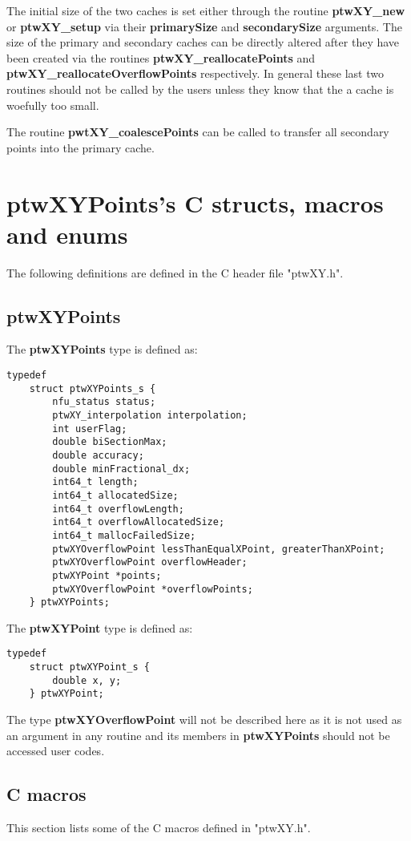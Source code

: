 \documentclass[11pt]{article}
\newcommand{\highlight}[1]{{\bf #1}}
\begin{document}
The initial size of the two caches is set either through the routine \highlight{ptwXY\_new} or \highlight{ptwXY\_\-setup} via their
\highlight{primarySize} and \highlight{secondarySize} arguments. The size of the primary and secondary caches can be directly altered after
they have been created via the
routines \highlight{ptwXY\_reallo\-cate\-Points} and \highlight{ptwXY\_\-reallo\-cate\-Overflow\-Points} respectively. 
In general these last two routines should
not be called by the users unless they know that the a cache is woefully too small.

The routine \highlight{pwtXY\_coalescePoints} can be called to transfer all secondary points into the primary cache.

\section{ptwXYPoints's C structs, macros and enums}
The following definitions are defined in the C header file "ptwXY.h".

\subsection{ptwXYPoints}
The \highlight{ptwXYPoints} type is defined as:
\begin{verbatim}
typedef
    struct ptwXYPoints_s {
        nfu_status status;
        ptwXY_interpolation interpolation;
        int userFlag;
        double biSectionMax;
        double accuracy;
        double minFractional_dx;
        int64_t length;
        int64_t allocatedSize;
        int64_t overflowLength;
        int64_t overflowAllocatedSize;
        int64_t mallocFailedSize;
        ptwXYOverflowPoint lessThanEqualXPoint, greaterThanXPoint;
        ptwXYOverflowPoint overflowHeader;
        ptwXYPoint *points;
        ptwXYOverflowPoint *overflowPoints;
    } ptwXYPoints;
\end{verbatim}

The \highlight{ptwXYPoint} type is defined as:
\begin{verbatim}
typedef
    struct ptwXYPoint_s {
        double x, y;
    } ptwXYPoint;
\end{verbatim}

The type \highlight{ptwXYOverflowPoint} will not be described here as it is not used as an argument in any routine and
its members in \highlight{ptwXYPoints} should not be accessed user codes.

\subsection{C macros}
This section lists some of the C macros defined in "ptwXY.h".
\end{document}
